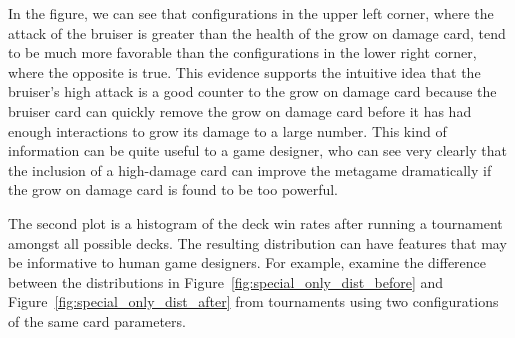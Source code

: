 \documentclass[letterpaper]{article} %
\begin{document}
In the figure, we can see that configurations in the upper left corner, where the attack of the bruiser is greater than the health of the grow on damage card, tend to be much more favorable than the configurations in the lower right corner, where the opposite is true. This evidence supports the intuitive idea that the bruiser's high attack is a good counter to the grow on damage card because the bruiser card can quickly remove the grow on damage card before it has had enough interactions to grow its damage to a large number. This kind of information can be quite useful to a game designer, who can see very clearly that the inclusion of a high-damage card can improve the metagame dramatically if the grow on damage card is found to be too powerful.

The second plot is a histogram of the deck win rates after running a tournament amongst all possible decks. %
The resulting distribution can have features that may be informative to human game designers. For example, examine the difference between the distributions %
in Figure~\ref{fig:special_only_dist_before} and Figure~\ref{fig:special_only_dist_after} from tournaments using two configurations of the same card parameters. 
\end{document}

